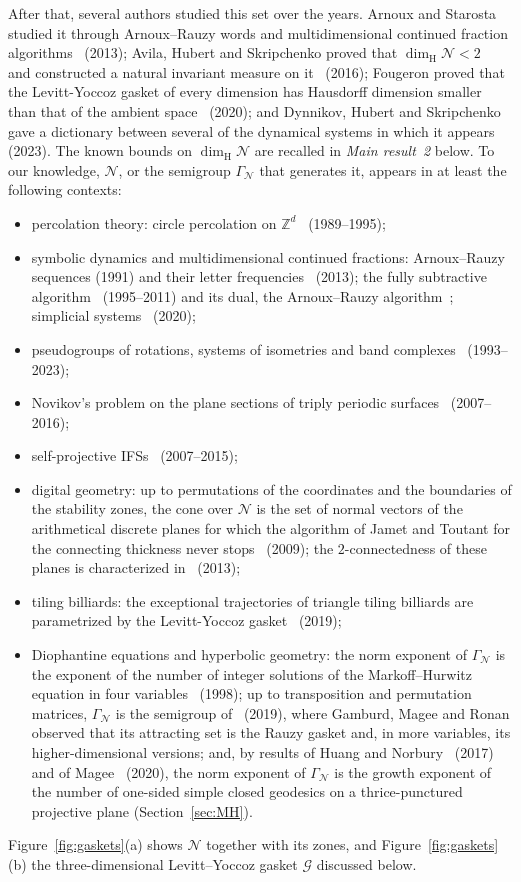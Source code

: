 \documentclass[11pt]{amsart}
\theoremstyle{definition}
\theoremstyle{remark}
\newcommand{\Z}{\mathbb Z}
\newcommand{\cN}{\mathcal N}
\newcommand{\GN}{\Gamma_{\mathcal N}}
\newcommand{\cG}{\mathcal G}
\newcommand{\dimH}{\dim_{\mathrm H}}
\begin{document}
After that, several authors studied this set over the years.
Arnoux and Starosta studied it through Arnoux--Rauzy words and multidimensional continued fraction algorithms~\cite{AS13} (2013); Avila, Hubert and Skripchenko proved that $\dimH\cN<2$~\cite{AHS16} and constructed a natural invariant measure on it~\cite{AHSinv} (2016); Fougeron proved that the Levitt-Yoccoz gasket of every dimension has Hausdorff dimension smaller than that of the ambient space~\cite{Fou20} (2020); and Dynnikov, Hubert and Skripchenko gave a dictionary between several of the dynamical systems in which it appears~\cite{DHS23} (2023).
The known bounds on $\dimH\cN$ are recalled in {\em Main result~2} below.
To our knowledge, $\cN$, or the semigroup $\GN$ that generates it, appears in at least the following contexts:
\begin{itemize}
\item percolation theory: circle percolation on $\Z^d$~\cite{Mee89,MN89,KM95} (1989--1995);
\item symbolic dynamics and multidimensional continued fractions: Arnoux--Rauzy sequences \cite{AR91} (1991) and their letter frequencies~\cite{AS13} (2013); the fully subtractive algorithm~\cite{KM95,Sch00,FKN11} (1995--2011) and its dual, the Arnoux--Rauzy algorithm~\cite{AS13}; simplicial systems~\cite{Fou20} (2020);
\item pseudogroups of rotations, systems of isometries and band complexes~\cite{Lev93,Dyn08,Skr12,DS15,AHS16,AHSinv,DHS23} (1993--2023);
\item Novikov's problem on the plane sections of triply periodic surfaces~\cite{DD07,DD09,DS15,AHSinv} (2007--2016);
\item self-projective IFSs~\cite{DD07,DL08,DL15JGA,DL15EM} (2007--2015);
\item digital geometry: up to permutations of the coordinates and the boundaries of the stability zones, the cone over $\cN$ is the set of normal vectors of the arithmetical discrete planes for which the algorithm of Jamet and Toutant for the connecting thickness never stops~\cite{JT09,DJT09} (2009); the $2$-connectedness of these planes is characterized in~\cite{BJJP13} (2013);
\item tiling billiards: the exceptional trajectories of triangle tiling billiards are parametrized by the Levitt-Yoccoz gasket~\cite{HPR19} (2019);
\item Diophantine equations and hyperbolic geometry: the norm exponent of $\GN$ is the exponent of the number of integer solutions of the Markoff--Hurwitz equation in four variables~\cite{Bar98} (1998); up to transposition and permutation matrices, $\GN$ is the semigroup of~\cite{GMR19} (2019), where Gamburd, Magee and Ronan observed that its attracting set is the Rauzy gasket and, in more variables, its higher-dimensional versions; and, by results of Huang and Norbury~\cite{HN17} (2017) and of Magee~\cite{Mag20} (2020), the norm exponent of $\GN$ is the growth exponent of the number of one-sided simple closed geodesics on a thrice-punctured projective plane (Section~\ref{sec:MH}).
\end{itemize}
Figure~\ref{fig:gaskets}(a) shows $\cN$ together with its zones, and Figure~\ref{fig:gaskets}(b) the three-dimensional Levitt--Yoccoz gasket $\cG$ discussed below.
\end{document}
